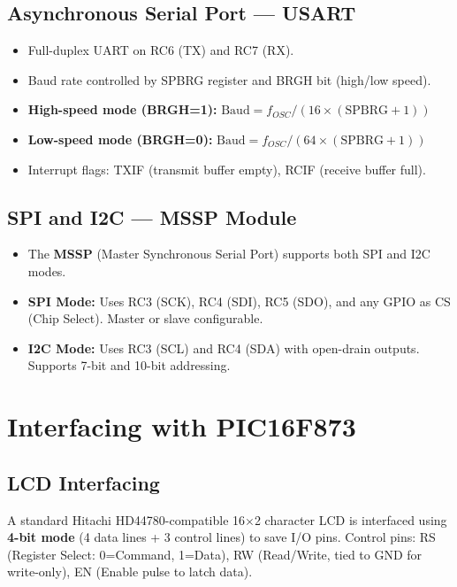 \documentclass[12pt,a4paper]{article}
\begin{document}
\subsection{Asynchronous Serial Port --- USART}
\begin{itemize}[leftmargin=*, itemsep=3pt]
  \item Full-duplex UART on RC6 (TX) and RC7 (RX).
  \item Baud rate controlled by SPBRG register and BRGH bit (high/low speed).
  \item \textbf{High-speed mode (BRGH=1):} $\text{Baud} = f_{OSC} / (16 \times (\text{SPBRG}+1))$
  \item \textbf{Low-speed mode (BRGH=0):} $\text{Baud} = f_{OSC} / (64 \times (\text{SPBRG}+1))$
  \item Interrupt flags: TXIF (transmit buffer empty), RCIF (receive buffer full).
\end{itemize}

\subsection{SPI and I2C --- MSSP Module}
\begin{itemize}[leftmargin=*, itemsep=3pt]
  \item The \textbf{MSSP} (Master Synchronous Serial Port) supports both SPI and I2C modes.
  \item \textbf{SPI Mode:} Uses RC3 (SCK), RC4 (SDI), RC5 (SDO), and any GPIO as CS (Chip Select). Master or slave configurable.
  \item \textbf{I2C Mode:} Uses RC3 (SCL) and RC4 (SDA) with open-drain outputs. Supports 7-bit and 10-bit addressing.
\end{itemize}

\section{Interfacing with PIC16F873}

\subsection{LCD Interfacing}

\begin{tcolorbox}[defbox, title={\textbf{LCD (16$\times$2) Interfacing with PIC16F873}}]
A standard Hitachi HD44780-compatible 16$\times$2 character LCD is interfaced using \textbf{4-bit mode} (4 data lines + 3 control lines) to save I/O pins. Control pins: RS (Register Select: 0=Command, 1=Data), RW (Read/Write, tied to GND for write-only), EN (Enable pulse to latch data).
\end{tcolorbox}
\end{document}
